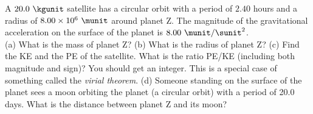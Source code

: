 A $20.0\ \kgunit$ satellite has a circular orbit with a period of $2.40$
hours and a radius of $8.00 \times 10^6\ \munit$ around planet Z. The
magnitude of the gravitational acceleration on the surface of the
planet is $8.00\ \munit/\sunit^2$.\\
%
(a) What is the mass of planet Z?\answercheck\hwendpart
%
(b) What is the radius of planet Z?\answercheck\hwendpart
%
(c) Find the KE and the PE of the satellite. What is the ratio PE/KE
(including both magnitude and sign)? You should get an integer. This is a special
case of something called the \emph{virial theorem}.\answercheck\hwendpart
%
(d) Someone standing on the surface of the planet sees a moon
orbiting the planet (a circular orbit) with a period of 20.0 days.
What is the distance between planet Z and its moon?\answercheck
